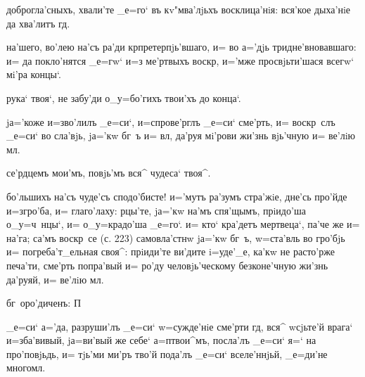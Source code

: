 доброгла'сныхъ, хвали'те _е=го` въ кv"мва'лjьхъ 
восклица'нiя: вся'кое дыха'нiе да хва'литъ гд.

на'шего, во'лею на'съ ра'ди кр претерпjь'вшаго, и= во 
а='дjь тридне'вновавшаго: и= да покло'нятся _е=гw` и=з\ъ 
ме'ртвыхъ воскр, и='мже просвjьти'шася всегw` мi'ра 
концы`.

рука` твоя`, не забу'ди о_у=бо'гихъ твои'хъ до конца`.

jа='коже и=зво'лилъ _е=си`, и=спрове'рглъ _е=си` сме'рть, 
и= воскр~слъ _е=си` во сла'вjь, jа='кw бг~ъ и= вл, 
да'руя мi'рови жи'знь вjь'чную и= ве'лiю мл.

се'рдцемъ мои'мъ, повjь'мъ вся^ чудеса` твоя^.

бо'льшихъ на'съ чуде'съ сподо'бисте! и='мутъ ра'зумъ 
стра'жiе, дне'сь про'йде и=з\ъ гро'ба, и= глаго'лаху: 
рцы'те, jа='кw на'мъ спя'щымъ, прiидо'ша о_у=ч~нцы`, и= 
о_у=крадо'ша _е=го`. и= кто` кра'детъ мертвеца`, па'че же 
и= на'га; са'мъ воскр~се (с. 223) самовла'стнw jа='кw 
бг~ъ, w=ста'вль во гро'бjь и= погреба'т_ельная своя^: 
прiиди'те ви'дите i=уде'_е, ка'кw не расто'рже печа'ти, 
сме'рть попра'вый и= ро'ду человjь'ческому безконе'чную 
жи'знь да'руяй, и= ве'лiю мл.

бг~оро'диченъ: П%

_е=си` а='да, разруши'лъ _е=си` w=сужде'нiе сме'рти 
гд, вся^ w\т сjьте'й врага` и=зба'вивый, jа=ви'вый же 
себе` а=п твои^мъ, посла'лъ _е=си` я=` на 
про'повjьдь, и= тjь'ми ми'ръ тво'й пода'лъ _е=си` 
вселе'ннjьй, _е=ди'не многомл.
